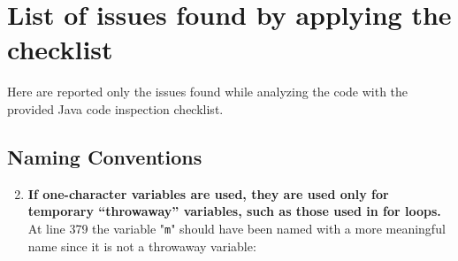 \documentclass[a4paper,11pt]{report} %
\begin{document}
	
	
	
	\section{List of issues found by applying the checklist} Here are reported only the issues found while analyzing the code with the provided Java code inspection checklist.
		\subsection*{Naming Conventions}\begin{enumerate}[resume]
			\setcounter{enumi}{1}	
			\item \textbf{If one-character variables are used, they are used only for temporary ``throwaway'' variables, such as those used in for loops.}\smallskip \\
				At line 379 the variable "\texttt{m}" should have been named with a more meaningful name since it is not a throwaway variable: \\
				\begin{minipage}{\linewidth}
				
				\end{minipage}
			

\end{enumerate}
\end{document}
